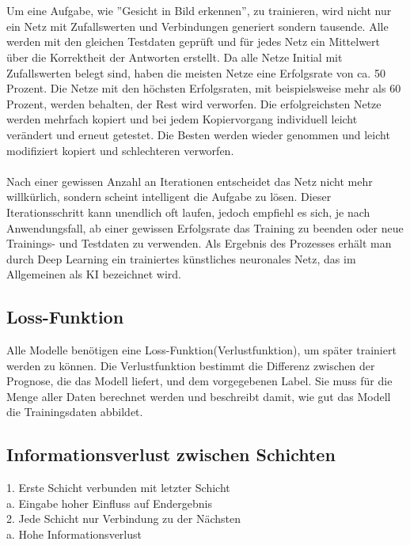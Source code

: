 \documentclass[12pt,oneside,a4paper,parskip]{scrbook}
\begin{document}
\\\\
Um eine Aufgabe, wie ''Gesicht in Bild erkennen'', zu trainieren, wird nicht nur ein Netz mit Zufallswerten und Verbindungen generiert sondern tausende. Alle werden mit den gleichen Testdaten geprüft und für jedes Netz ein Mittelwert über die Korrektheit der Antworten erstellt. Da alle Netze Initial mit Zufallswerten belegt sind, haben die meisten Netze eine Erfolgsrate von ca. 50 Prozent. Die Netze mit den höchsten Erfolgsraten, mit beispielsweise mehr als 60 Prozent, werden behalten, der Rest wird verworfen. Die erfolgreichsten Netze werden mehrfach kopiert und bei jedem Kopiervorgang individuell leicht verändert und erneut getestet. Die Besten werden wieder genommen und leicht modifiziert kopiert und schlechteren verworfen.
\\\\
Nach einer gewissen Anzahl an Iterationen entscheidet das Netz nicht mehr willkürlich, sondern scheint intelligent die Aufgabe zu lösen. Dieser Iterationsschritt kann unendlich oft laufen, jedoch empfiehl es sich, je nach Anwendungsfall, ab einer gewissen Erfolgsrate das Training zu beenden oder neue Trainings- und Testdaten zu verwenden. Als Ergebnis des Prozesses erhält man durch Deep Learning ein trainiertes künstliches neuronales Netz, das im Allgemeinen als KI bezeichnet wird.

\subsection{Loss-Funktion}
\label{section:lossFunction}

Alle Modelle benötigen eine Loss-Funktion(Verlustfunktion), um später trainiert werden zu können. Die Verlustfunktion bestimmt die Differenz zwischen der Prognose, die das Modell liefert, und dem vorgegebenen Label. Sie muss für die Menge aller Daten berechnet werden und beschreibt damit, wie gut das Modell die Trainingsdaten abbildet. 
\subsection{Informationsverlust zwischen Schichten}
1.	Erste Schicht verbunden mit letzter Schicht\\
	a.	Eingabe hoher Einfluss auf Endergebnis\\
2.	Jede Schicht nur Verbindung zu der Nächsten\\
	a.	Hohe Informationsverlust\\
\end{document}

